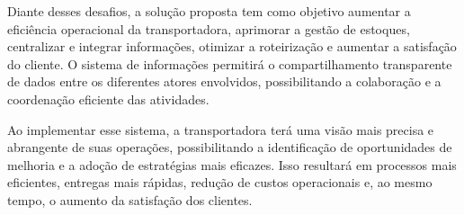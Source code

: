 Diante desses desafios, a solução proposta tem como objetivo aumentar a eficiência operacional da transportadora, aprimorar a gestão de estoques, centralizar e integrar informações, otimizar a roteirização e aumentar a satisfação do cliente. O sistema de informações permitirá o compartilhamento transparente de dados entre os diferentes atores envolvidos, possibilitando a colaboração e a coordenação eficiente das atividades.

Ao implementar esse sistema, a transportadora terá uma visão mais precisa e abrangente de suas operações, possibilitando a identificação de oportunidades de melhoria e a adoção de estratégias mais eficazes. Isso resultará em processos mais eficientes, entregas mais rápidas, redução de custos operacionais e, ao mesmo tempo, o aumento da satisfação dos clientes.
